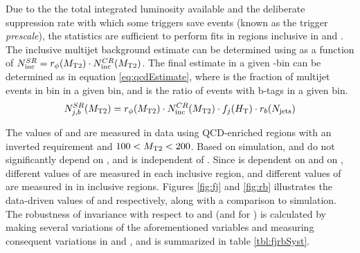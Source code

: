 Due to the the total integrated luminosity available and the deliberate suppression rate with which some \HT triggers save events (known as the trigger {\it prescale}), the statistics are sufficient to perform fits in \HT regions inclusive in \nj and \nj. The inclusive multijet background estimate can be determined using \rphi as a function of \mttwo $N_{\mathrm{inc}}^{SR} = r_\phi (M_{\mathrm{T2}}) \cdot N_{\mathrm{inc}}^{CR} (M_{\mathrm{T2}})$. The final estimate in a given \nj-\nb bin can be determined as in equation \ref{eq:qcdEstimate}, where \fj is the fraction of multijet events in bin \nj in a given \HT bin, and \rb is the ratio of events with \nb b-tags in a given \nj bin. 
\begin{equation}
	N_{j,b}^{SR}(M_{\mathrm{T2}}) = r_\phi (M_{\mathrm{T2}}) \cdot N_{\mathrm{inc}}^{CR} (M_{\mathrm{T2}}) \cdot f_j (H_{\mathrm{T}}) \cdot r_b (N_{\mathrm{jets}}) 
	\label{eq:qcdEstimate}
\end{equation}

The values of \fj and \rb are measured in data using QCD-enriched regions with an inverted \dphi requirement and $100 < M_{\mathrm{T2}} < 200$. Based on simulation, \fj and \rb do not significantly depend on \mttwo, and \rb is independent of \HT. Since \fj is dependent on \HT and \rb on \nj, different values of \fj are measured in each inclusive \HT region, and different values of \rb are measured in in inclusive \nj regions. Figures \ref{fig:fj} and \ref{fig:rb} illustrates the data-driven values of \fj and \rb respectively, along with a comparison to simulation. The robustness of invariance with respect to \mttwo and \dphi (and \HT for \rb) is calculated by making several variations of the aforementioned variables and measuring consequent variations in \fj and \rb, and is summarized in table \ref{tbl:fjrbSyst}.

